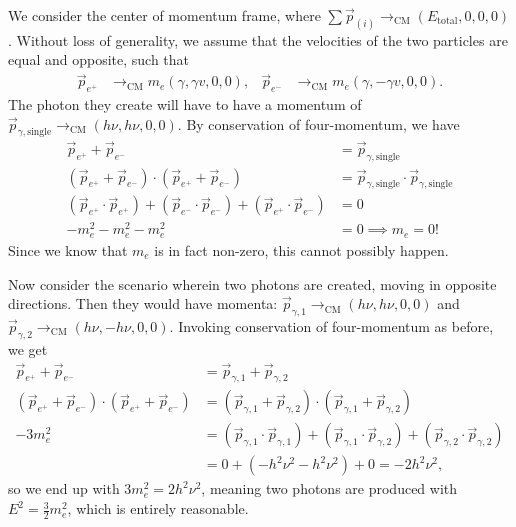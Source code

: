 \documentclass[gr-notes.tex]{subfiles}
\begin{document}
We consider the center of momentum frame, where $\sum \vec{p}_{(i)} \to_{\mathrm{CM}} (E_{\mathrm{total}}, 0, 0, 0)$. Without loss of generality, we assume that the velocities of the two particles are equal and opposite, such that
%
\begin{align*}
  \vec{p}_{e^+} &\to_{\mathrm{CM}} m_e (\gamma,  \gamma v, 0, 0), &
  \vec{p}_{e^-} &\to_{\mathrm{CM}} m_e (\gamma, -\gamma v, 0, 0).
\end{align*}
%
The photon they create will have to have a momentum of $\vec{p}_{\gamma,\mathrm{single}} \to_{\mathrm{CM}} (h \nu, h \nu, 0, 0)$. By conservation of four-momentum, we have
%
\begin{align*}
  \vec{p}_{e^+} + \vec{p}_{e^-} &= \vec{p}_{\gamma,\mathrm{single}}
  \\
  (\vec{p}_{e^+} + \vec{p}_{e^-}) \cdot (\vec{p}_{e^+} + \vec{p}_{e^-}) &=
  \vec{p}_{\gamma,\mathrm{single}} \cdot \vec{p}_{\gamma,\mathrm{single}}
  \\
  (\vec{p}_{e^+} \cdot \vec{p}_{e^+}) +
  (\vec{p}_{e^-} \cdot \vec{p}_{e^-}) +
  (\vec{p}_{e^+} \cdot \vec{p}_{e^-}) &=
  0
  \\
  -m_e^2 - m_e^2 - m_e^2 &= 0
  \implies m_e = 0!
\end{align*}
%
Since we know that $m_e$ is in fact non-zero, this cannot possibly happen.

Now consider the scenario wherein two photons are created, moving in opposite directions. Then they would have momenta: $\vec{p}_{\gamma,1} \to_{\mathrm{CM}} (h \nu, h \nu, 0, 0)$ and $\vec{p}_{\gamma,2} \to_{\mathrm{CM}} (h \nu, -h \nu, 0, 0)$. Invoking conservation of four-momentum as before, we get
%
\begin{align*}
  \vec{p}_{e^+} + \vec{p}_{e^-} &= \vec{p}_{\gamma,1} + \vec{p}_{\gamma,2}
  \\
  (\vec{p}_{e^+} + \vec{p}_{e^-}) \cdot
  (\vec{p}_{e^+} + \vec{p}_{e^-}) &=
  (\vec{p}_{\gamma,1} + \vec{p}_{\gamma,2}) \cdot
  (\vec{p}_{\gamma,1} + \vec{p}_{\gamma,2})
  \\
  -3 m_e^2 &=
  (\vec{p}_{\gamma,1} \cdot \vec{p}_{\gamma,1}) +
  (\vec{p}_{\gamma,1} \cdot \vec{p}_{\gamma,2}) +
  (\vec{p}_{\gamma,2} \cdot \vec{p}_{\gamma,2})
  \\ &=
  0 + (-h^2 \nu^2 - h^2 \nu^2) + 0 =
  -2 h^2 \nu^2,
\end{align*}
%
so we end up with $3 m_e^2 = 2 h^2 \nu^2$, meaning two photons are produced with $E^2 = \frac{3}{2} m_e^2$, which is entirely reasonable.
\end{document}
